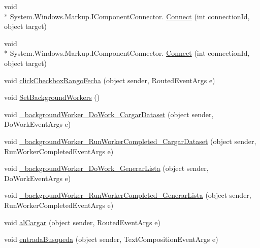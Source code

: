 \begin{DoxyCompactItemize}
\item 
void \\*
System.\-Windows.\-Markup.\-I\-Component\-Connector. \hyperlink{class_proyecto___integrador__3_1_1_reportes_1_1_reporte_por_unidad_a9187061f0de7982d8288e86ce4cb0016}{Connect} (int connection\-Id, object target)
\item 
void \\*
System.\-Windows.\-Markup.\-I\-Component\-Connector. \hyperlink{class_proyecto___integrador__3_1_1_reportes_1_1_reporte_por_unidad_a9187061f0de7982d8288e86ce4cb0016}{Connect} (int connection\-Id, object target)
\item 
void \hyperlink{class_proyecto___integrador__3_1_1_reportes_1_1_reporte_por_unidad_a9a61cc4efa82756608e42d88eba0add8}{click\-Checkbox\-Rango\-Fecha} (object sender, Routed\-Event\-Args e)
\item 
void \hyperlink{class_proyecto___integrador__3_1_1_reportes_1_1_reporte_por_unidad_aa2d3e7e349c3f899132bfc95099089c2}{Set\-Background\-Workers} ()
\item 
void \hyperlink{class_proyecto___integrador__3_1_1_reportes_1_1_reporte_por_unidad_aa84fc5563333c7e790cdfce10661cbfa}{\-\_\-background\-Worker\-\_\-\-Do\-Work\-\_\-\-Cargar\-Dataset} (object sender, Do\-Work\-Event\-Args e)
\item 
void \hyperlink{class_proyecto___integrador__3_1_1_reportes_1_1_reporte_por_unidad_a2d4b49248bce9187c40bc24a804b7fc7}{\-\_\-background\-Worker\-\_\-\-Run\-Worker\-Completed\-\_\-\-Cargar\-Dataset} (object sender, Run\-Worker\-Completed\-Event\-Args e)
\item 
void \hyperlink{class_proyecto___integrador__3_1_1_reportes_1_1_reporte_por_unidad_ae3378ea4446e84616184350803cdd093}{\-\_\-background\-Worker\-\_\-\-Do\-Work\-\_\-\-Generar\-Lista} (object sender, Do\-Work\-Event\-Args e)
\item 
void \hyperlink{class_proyecto___integrador__3_1_1_reportes_1_1_reporte_por_unidad_a0819f9c0e0427598f8281fc063c9bca8}{\-\_\-background\-Worker\-\_\-\-Run\-Worker\-Completed\-\_\-\-Generar\-Lista} (object sender, Run\-Worker\-Completed\-Event\-Args e)
\item 
void \hyperlink{class_proyecto___integrador__3_1_1_reportes_1_1_reporte_por_unidad_a5511b34d472dd27aed3bf7e8fb8be201}{al\-Cargar} (object sender, Routed\-Event\-Args e)
\item 
void \hyperlink{class_proyecto___integrador__3_1_1_reportes_1_1_reporte_por_unidad_a3ccd580cea651ecc0db27c98828266ec}{entrada\-Busqueda} (object sender, Text\-Composition\-Event\-Args e)

\end{DoxyCompactItemize}
